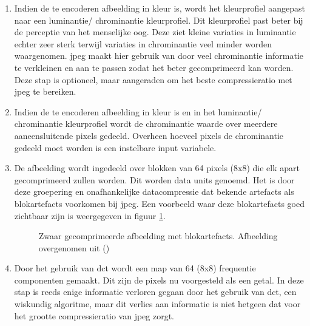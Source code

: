 \begin{enumerate}
	
	\item Indien de te encoderen afbeelding in kleur is, wordt het kleurprofiel aangepast naar een luminantie/ chrominantie kleurprofiel. Dit kleurprofiel past beter bij de perceptie van het menselijke oog. Deze ziet kleine variaties in luminantie echter zeer sterk terwijl variaties in chrominantie veel minder worden waargenomen. \Gls{jpeg} maakt hier gebruik van door veel chrominantie informatie te verkleinen en aan te passen zodat het beter gecomprimeerd kan worden. Deze stap is optioneel, maar aangeraden om het beste \gls{compressieratio} met \gls{jpeg} te bereiken.
	
	\item Indien de te encoderen afbeelding in kleur is en in het luminantie/ chrominantie kleurprofiel wordt de chrominantie waarde over meerdere aaneensluitende pixels gedeeld. Overheen hoeveel pixels de chrominantie gedeeld moet worden is een instelbare input variabele.
	
	\item De afbeelding wordt ingedeeld over blokken van 64 pixels (8x8) die elk apart gecomprimeerd zullen worden. Dit worden data units genoemd. Het is door deze groepering en onafhankelijke \gls{datacompressie} dat bekende \glspl{artefact} als blok\glspl{artefact} voorkomen bij \gls{jpeg}. Een voorbeeld waar deze blok\glspl{artefact} goed zichtbaar zijn is weergegeven in figuur \ref{fig:block-artefact}.
	
	\begin{figure}
		\centering
		\caption{Zwaar gecomprimeerde afbeelding met blok\glspl{artefact}. Afbeelding overgenomen uit  (\cite{blokartefact})}
		\label{fig:block-artefact}
	\end{figure}
	
	\item Door het gebruik van \gls{dct} wordt een map van 64 (8x8) frequentie componenten gemaakt. Dit zijn de pixels nu voorgesteld als een getal. In deze stap is reeds enige informatie verloren gegaan door het gebruik van \gls{dct}, een wiskundig algoritme, maar dit verlies aan informatie is niet hetgeen dat voor het grootte \gls{compressieratio} van \gls{jpeg} zorgt.
	

\end{enumerate}
